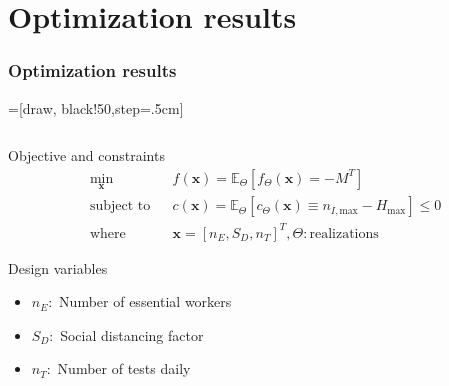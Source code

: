 \section{Optimization results}
\begin{frame}[t]
	\frametitle{Optimization results}
	=[draw, black!50,step=.5cm]
	\\
	\begin{columns}[t] %
		\begin{column}{.42\textwidth} %
			\vspace{-1.2em}
			\begin{exampleblock}{Objective and constraints}
				\vspace{-1.2em}
				\begin{equation*}
					\begin{aligned}
						& \underset{\mathbf{x}}{\text{min}}
						& & f(\mathbf{x}) = \mathbb{E}_{\Theta}\left[{f}_{\Theta}(\mathbf{x}) = -M^{T}\right]\\
						& \text{subject to}
						& & {c}(\mathbf{x}) = \mathbb{E}_{\Theta}\left[{c}_{\Theta}(\mathbf{x}) \equiv n_{I,\text{max}} - H_{\text{max}}\right] \le 0\\
						& \text{where}
						& & \mathbf{x}=\left[n_E,S_D,n_T\right]^\mathit{T},\Theta\mathrm{:realizations}
					\end{aligned}
				\end{equation*}
			\end{exampleblock}
			\vspace{-0.5em}
			\begin{alertblock}{Design variables}
				\vspace{-0.0em}
					\begin{itemize}\itemsep0em
						\item $n_E:$ Number of essential workers
						\item $S_D:$ Social distancing factor
						\item $n_T:$ Number of tests daily
					\end{itemize}
			\end{alertblock}

\end{column}
\end{columns}
\end{frame}
